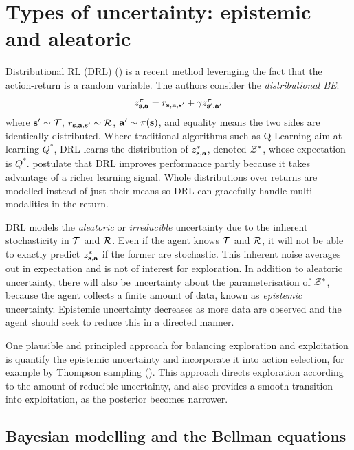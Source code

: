 \documentclass{article}
\begin{document}
\section{Types of uncertainty: epistemic and aleatoric}

Distributional RL (DRL) (\cite{distperrl}) is a recent method leveraging the fact that the action-return is a random variable. The authors consider the \textit{distributional BE}:
\begin{align} \label{eq:distributional}
z^\pi_{\mathbf{s}, \mathbf{a}} = r_{\mathbf{s}, \mathbf{a}, \mathbf{s}'} + \gamma z^\pi_{\mathbf{s}', \mathbf{a}'}
\end{align}
where $\mathbf{s}' \sim \mathcal{T}$, $r_{\mathbf{s}, \mathbf{a}, \mathbf{s}'} \sim \mathcal{R}$, $\mathbf{a}' \sim \pi(\mathbf{s})$, and equality means the two sides are identically distributed. Where traditional algorithms such as Q-Learning aim at learning $Q^*$, DRL learns the distribution of $z^*_{\mathbf{s}, \mathbf{a}}$, denoted $\mathcal{Z}^*$, whose expectation is $Q^*$. \cite{distperrl} postulate that DRL improves performance partly because it takes advantage of a richer learning signal. Whole distributions over returns are modelled instead of just their means so DRL can gracefully handle multi-modalities in the return.

DRL models the \textit{aleatoric} or \textit{irreducible} uncertainty due to the inherent stochasticity in $\mathcal{T}$ and $\mathcal{R}$. Even if the agent knows $\mathcal{T}$ and $\mathcal{R}$, it will not be able to exactly predict $z^*_{\mathbf{s}, \mathbf{a}}$ if the former are stochastic. This inherent noise averages out in expectation and is not of interest for exploration. In addition to aleatoric uncertainty, there will also be uncertainty about the parameterisation of $\mathcal{Z}^*$, because the agent collects a finite amount of data, known as \textit{epistemic} uncertainty. Epistemic uncertainty decreases as more data are observed and the agent should seek to reduce this in a directed manner.

One plausible and principled approach for balancing exploration and exploitation is quantify the epistemic uncertainty and incorporate it into action selection, for example by Thompson sampling (\cite{thompson}). This approach directs exploration according to the amount of reducible uncertainty, and also provides a smooth transition into exploitation, as the posterior becomes narrower. 

\subsection{Bayesian modelling and the Bellman equations}
\end{document}
